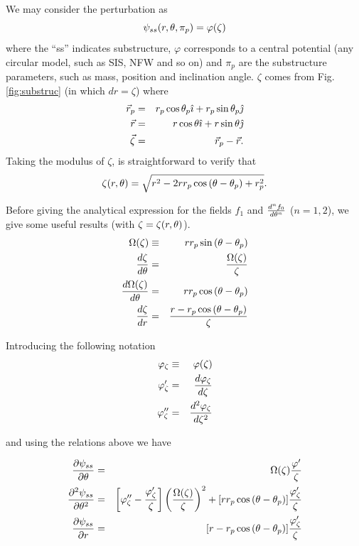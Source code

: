 We may consider the perturbation as
\begin{equation}
\psi_{ss}(r,\theta,\pi_p)=\varphi(\zeta)
\end{equation}
where the ``ss'' indicates substructure, $\varphi$ corresponds to a central potential (any circular model, such as SIS, NFW and so on) and $\pi_p$
are the substructure parameters, such as mass, position and inclination angle. $\zeta$ comes from Fig. \ref{fig:substruc} (in which $dr=\zeta$)
where
\begin{eqnarray}
\vec{r}_p&=&r_p\cos{\theta_p}\hat{\imath} + r_p\sin{\theta_p}\hat{\jmath}\\
\vec{r}&=&r\cos{\theta}\hat{\imath} + r\sin{\theta}\hat{\jmath}\\
\vec{\zeta}&=&\vec{r}_p-\vec{r}.
\end{eqnarray}
Taking the modulus of $\zeta$, is straightforward to verify that
\begin{equation}
\zeta(r,\theta)=\sqrt{r^2-2r r_p\cos{(\theta-\theta_p)}+r^2_p}.
\label{xirte}
\end{equation}

Before giving the analytical expression for the fields $f_1$ and ${d^nf_0 \over d\theta^n}$ ($n=1,2$), we
give some useful results (with $\zeta = \zeta(r,\theta)$).
\begin{eqnarray}
\Omega(\zeta) & \equiv & r r_p \sin{(\theta-\theta_p)} \\
\dfrac{d\zeta}{d\theta}&=&  \dfrac{\Omega(\zeta)}{\zeta}\\
\dfrac{d\Omega(\zeta)}{d\theta}&=&r r_p\cos{(\theta-\theta_p)}\\
\dfrac{d\zeta}{dr}&=&\dfrac{r-r_p\cos{(\theta-\theta_p)}}{\zeta}
\end{eqnarray}

Introducing the following notation
\begin{eqnarray}
\varphi_\zeta & \equiv & \varphi(\zeta) \\
\varphi^\prime_\zeta &=& d\varphi_\zeta \over d\zeta \\
\varphi^{\prime\prime}_\zeta &=& d^2\varphi_\zeta \over d\zeta^2
\end{eqnarray}

and using the relations above we have

\begin{eqnarray}
\dfrac{\prtl \psi_{ss}}{\prtl \te}&=&\Omega(\zeta)\dfrac{\varphi^\prime}{\zeta}\label{df0}\\
\dfrac{\prtl^2 \psi_{ss}}{\prtl\te^2}&=&\left[\varphi^{\prime\prime}_\zeta-\dfrac{\varphi^\prime_\zeta}{\zeta}\right]%
\left(\dfrac{\Omega(\zeta)}{\zeta}\right)^2+[r r_p\cos{(\te-\tep)}]\dfrac{\varphi^\prime_\zeta}{\zeta}\label{ddf0}\\
\dfrac{\prtl \psi_{ss}}{\prtl r}&=&[r-r_p\cos{(\te-\tep)}]\dfrac{\varphi^\prime_\zeta}{\zeta}\label{f1}
\end{eqnarray}

